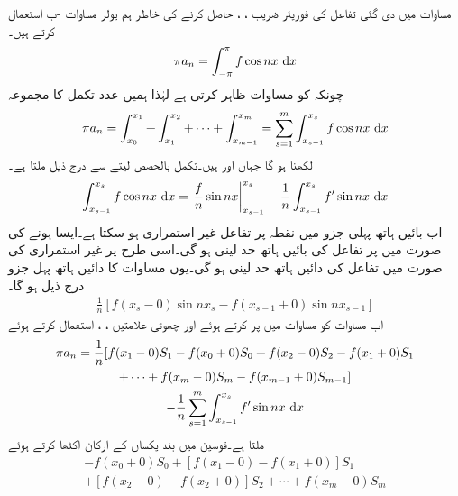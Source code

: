 مساوات  میں دی گئی تفاعل  کی فوریئر  ضریب  ، ،  حاصل کرنے کی خاطر ہم یولر مساوات -ب استعمال کرتے ہیں۔
\begin{align}\label{مساوات_فوریئر_بائیں_دائیں_حد_الف}
\pi a_n=\int_{-\pi}^{\pi} f \cos nx \, \dif x
\end{align}
چونکہ  کو مساوات  ظاہر کرتی ہے لہٰذا ہمیں  عدد تکمل کا مجموعہ
\begin{align}\label{مساوات_فوریئر_بائیں_دائیں_حد_ب}
\pi a_n=\int_{x_0}^{x_1}+\int_{x_1}^{x_2}+\cdots+\int_{x_{m-1}}^{x_m}=\sum_{s=1}^{m}\int_{x_{s-1}}^{x_s} f\cos nx\, \dif x
\end{align}
لکھنا ہو گا جہاں  اور  ہیں۔تکمل بالحصص لیتے سے درج ذیل ملتا ہے۔
\begin{align}\label{مساوات_فوریئر_بائیں_دائیں_حد_پ}
\int_{x_{s-1}}^{x_s} f \cos nx\, \dif x=\left. \frac{f}{n} \sin nx\right|_{x_{s-1}}^{x_s}-\frac{1}{n}\int_{x_{s-1}}^{x_s} f'\sin nx\,\dif x
\end{align}
اب بائیں ہاتھ پہلی جزو میں نقطہ  پر تفاعل  غیر استمراری ہو سکتا ہے۔ایسا ہونے کی صورت میں  پر تفاعل کی بائیں ہاتھ حد  لینی ہو گی۔اسی طرح  پر غیر استمراری  کی صورت میں تفاعل کی دائیں ہاتھ حد  لینی ہو گی۔یوں  مساوات  کا دائیں ہاتھ پہل جزو درج ذیل ہو گا۔
\begin{align*}
\frac{1}{n}[f(x_s-0)\sin nx_s-f(x_{s-1}+0)\sin nx_{s-1}]
\end{align*} 
اب مساوات  کو مساوات  میں پر کرتے ہوئے اور چھوٹی علامتیں ، ،   استعمال کرتے ہوئے
\begin{multline}\label{مساوات_فوریئر_بائیں_دائیں_حد_ت}
\pi a_n=\frac{1}{n}[f(x_1-0)S_1-f(x_0+0)S_0+f(x_2-0)S_2-f(x_1+0)S_1\\
+\cdots +f(x_m-0)S_m-f(x_{m-1}+0)S_{m-1}]\\
-\frac{1}{n}\sum_{s=1}^{m}\int_{x_{s-1}}^{x_s} f' \sin nx \,\dif x
\end{multline}
ملتا ہے۔قوسین میں بند  یکساں  کے ارکان اکٹھا کرتے ہوئے 
\begin{multline}\label{مساوات_فوریئر_بائیں_دائیں_حد_ٹ}
-f(x_0+0)S_0+[f(x_1-0)-f(x_1+0)]S_1\\
+[f(x_2-0)-f(x_2+0)]S_2+\cdots+f(x_m-0)S_m
\end{multline}
